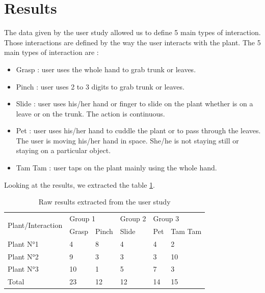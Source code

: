 \section{Results}

The data given by the user study allowed us to define 5 main types of interaction. Those interactions are defined by the way the user interacts with the plant. The 5 main types of interaction are :

\begin{itemize}
    \item Grasp : user uses the whole hand to grab trunk or leaves.
    \item Pinch : user uses 2 to 3 digits to grab trunk or leaves.
    \item Slide : user uses his/her hand or finger to slide on the plant whether is on a leave or on the trunk. The action is continuous.
    \item Pet : user uses his/her hand to cuddle the plant or to pass through the leaves. The user is moving his/her hand in space. She/he is not staying still or staying on a particular object.
    \item Tam Tam : user taps on the plant mainly using the whole hand.
\end{itemize}



Looking at the results, we extracted the table \ref{tab:results}.


\begin{table}[ht]
\begin{tabular}{|l|ll|l|ll|}
\hline
\multirow{2}{*}{Plant/Interaction} & \multicolumn{2}{l|}{Group 1}       & Group 2 & \multicolumn{2}{l|}{Group 3}       \\ \cline{2-6} 
                                   & \multicolumn{1}{l|}{Grasp} & Pinch & Slide   & \multicolumn{1}{l|}{Pet} & Tam Tam \\ \hline
Plant N°1                          & \multicolumn{1}{l|}{4}     & 8     & 4       & \multicolumn{1}{l|}{4}   & 2       \\ \hline
Plant N°2                          & \multicolumn{1}{l|}{9}     & 3     & 3       & \multicolumn{1}{l|}{3}   & 10      \\ \hline
Plant N°3                          & \multicolumn{1}{l|}{10}    & 1     & 5       & \multicolumn{1}{l|}{7}   & 3       \\ \hline
Total                              & \multicolumn{1}{l|}{23}    & 12    & 12      & \multicolumn{1}{l|}{14}  & 15      \\ \hline
\end{tabular}
\caption{Raw results extracted from the user study}
\label{tab:results}
\end{table}


